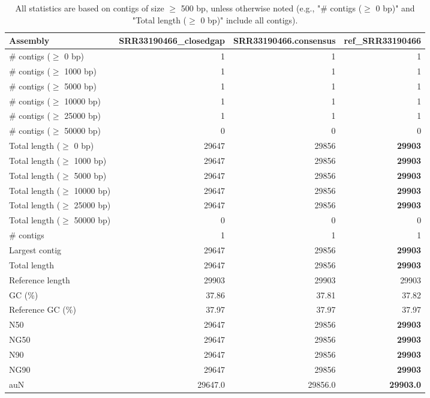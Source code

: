 \documentclass[12pt,a4paper]{article}
\begin{document}
\begin{table}[ht]
\begin{center}
\caption{All statistics are based on contigs of size $\geq$ 500 bp, unless otherwise noted (e.g., "\# contigs ($\geq$ 0 bp)" and "Total length ($\geq$ 0 bp)" include all contigs).}
\begin{tabular}{|l*{3}{|r}|}
\hline
Assembly & SRR33190466\_closedgap & SRR33190466.consensus & ref\_SRR33190466 \\ \hline
\# contigs ($\geq$ 0 bp) & 1 & 1 & 1 \\ \hline
\# contigs ($\geq$ 1000 bp) & 1 & 1 & 1 \\ \hline
\# contigs ($\geq$ 5000 bp) & 1 & 1 & 1 \\ \hline
\# contigs ($\geq$ 10000 bp) & 1 & 1 & 1 \\ \hline
\# contigs ($\geq$ 25000 bp) & 1 & 1 & 1 \\ \hline
\# contigs ($\geq$ 50000 bp) & 0 & 0 & 0 \\ \hline
Total length ($\geq$ 0 bp) & 29647 & 29856 & {\bf 29903} \\ \hline
Total length ($\geq$ 1000 bp) & 29647 & 29856 & {\bf 29903} \\ \hline
Total length ($\geq$ 5000 bp) & 29647 & 29856 & {\bf 29903} \\ \hline
Total length ($\geq$ 10000 bp) & 29647 & 29856 & {\bf 29903} \\ \hline
Total length ($\geq$ 25000 bp) & 29647 & 29856 & {\bf 29903} \\ \hline
Total length ($\geq$ 50000 bp) & 0 & 0 & 0 \\ \hline
\# contigs & 1 & 1 & 1 \\ \hline
Largest contig & 29647 & 29856 & {\bf 29903} \\ \hline
Total length & 29647 & 29856 & {\bf 29903} \\ \hline
Reference length & 29903 & 29903 & 29903 \\ \hline
GC (\%) & 37.86 & 37.81 & 37.82 \\ \hline
Reference GC (\%) & 37.97 & 37.97 & 37.97 \\ \hline
N50 & 29647 & 29856 & {\bf 29903} \\ \hline
NG50 & 29647 & 29856 & {\bf 29903} \\ \hline
N90 & 29647 & 29856 & {\bf 29903} \\ \hline
NG90 & 29647 & 29856 & {\bf 29903} \\ \hline
auN & 29647.0 & 29856.0 & {\bf 29903.0} \\ \hline

\end{tabular}
\end{center}
\end{table}
\end{document}
